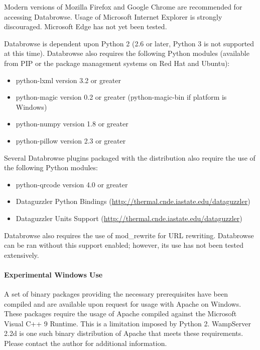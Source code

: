 \documentclass[10pt]{article}
\begin{document}
Modern versions of Mozilla Firefox and Google Chrome are recommended for accessing Databrowse.  Usage of Microsoft Internet Explorer is strongly discouraged.  Microsoft Edge has not yet been tested.

Databrowse is dependent upon Python 2 (2.6 or later, Python 3 is not supported at this time).  Databrowse also requires the following Python modules (available from PIP or the package management systems on Red Hat and Ubuntu):

\begin{itemize}
	\item python-lxml version 3.2 or greater
	\item python-magic version 0.2 or greater  (python-magic-bin if platform is Windows)
	\item python-numpy version 1.8 or greater
	\item python-pillow version 2.3 or greater
	
\end{itemize}

Several Databrowse plugins packaged with the distribution also require the use of the following Python modules:

\begin{itemize}
	\item python-qrcode version 4.0 or greater
	\item Dataguzzler Python Bindings (\url{http://thermal.cnde.iastate.edu/dataguzzler})
	\item Dataguzzler Units Support (\url{http://thermal.cnde.iastate.edu/dataguzzler})
\end{itemize}

Databrowse also requires the use of mod\_rewrite for URL rewriting.  Databrowse can be ran without this support enabled; however, its use has not been tested extensively.

\setcounter{tocdepth}{4}
\setcounter{secnumdepth}{4}
\paragraph{Experimental Windows Use}

A set of binary packages providing the necessary prerequisites have been compiled and are available upon request for usage with Apache on Windows.  These packages require the usage of Apache compiled against the Microsoft Visual C++ 9 Runtime.  This is a limitation imposed by Python 2.  WampServer 2.2d is one such binary distribution of Apache that meets these requirements.  Please contact the author for additional information. 
\end{document}
